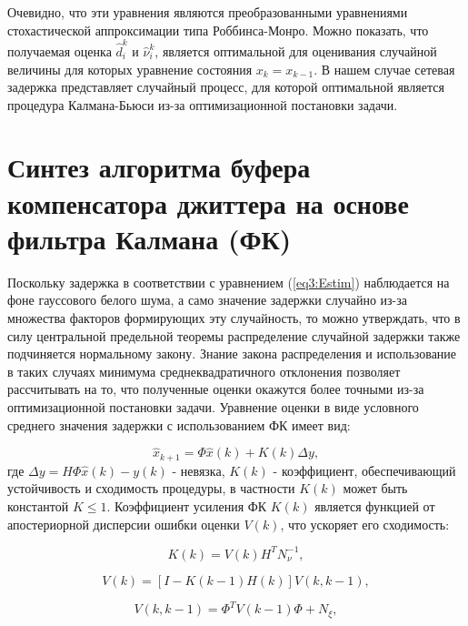 Очевидно, что эти уравнения являются преобразованными уравнениями стохастической аппроксимации типа Роббинса-Монро. Можно показать, что получаемая оценка $\hat{d}_{i}^{k}$ и $\hat{\nu}_{i}^{k}$, является оптимальной для оценивания случайной величины для которых уравнение состояния $x_k=x_{k-1}$. В нашем случае сетевая задержка представляет случайный процесс, для которой оптимальной является процедура Калмана-Бьюси из-за оптимизационной постановки задачи.

\section{Синтез алгоритма буфера компенсатора джиттера на основе фильтра Калмана (ФК)} \label{sect3_5}

Поскольку задержка в соответствии с уравнением (\ref{eq3:Estim}) наблюдается на фоне гауссового белого шума, а само значение задержки случайно из-за множества факторов формирующих эту случайность, то можно утверждать, что в силу центральной предельной теоремы распределение случайной задержки также подчиняется нормальному закону. Знание закона распределения и использование в таких случаях минимума среднеквадратичного отклонения позволяет рассчитывать на то, что полученные оценки окажутся более точными из-за оптимизационной постановки задачи. 
Уравнение оценки в виде условного среднего значения задержки с использованием ФК имеет вид:

\begin{equation}\label{eq3:Estim_rel}
\hat{x}_{k+1}=\Phi\hat{x}(k)+K(k)\Delta y,
\end{equation}
\noindent где $\Delta y=H\Phi\hat{x}(k)-y(k)$ - невязка, $K(k)$ - коэффициент, обеспечивающий устойчивость и сходимость процедуры, в частности $K(k)$ может быть константой $K\leq1$. Коэффициент усиления ФК $K(k)$ является функцией от апостериорной дисперсии ошибки оценки $V(k)$, что ускоряет его сходимость:

\begin{equation}\label{eq3:K}
K(k)=V(k)H^TN_{\nu}^{-1},
\end{equation}
 
\begin{equation}\label{eq3:V}
V(k)=[I-K(k-1)H(k)]V(k,k-1),
\end{equation}


\begin{equation}\label{eq3:Vkk-1}
V(k,k-1)=\Phi^TV(k-1)\Phi+N_\xi,
\end{equation}

